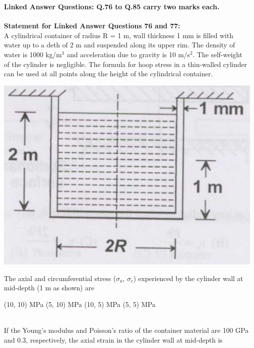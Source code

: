 \documentclass[addpoints,11pt]{exam}
\begin{document}
\begin{questions}
\large\textbf{Linked Answer Questions: Q.76 to Q.85 carry two marks each.}\\\\
\normalsize\textbf{Statement for Linked Answer Questions 76 and 77:}\\

A cylindrical container of radius R = 1 m, wall thickness 1 mm is filled with water up to a deth of 2 m and suspended along its upper rim. The density of water is 1000 kg/m$^3$ and acceleration due to gravity is 10 m/s$^2$. The self-weight of the cylinder is negligible. The formula for hoop stress in a thin-walled cylinder can be used at all points along the height of the cylindrical container.

\begin{center}
    \includegraphics[scale=0.3]{q76}
\end{center}

    \question The axial and circumferential stress ($\sigma_a$, $\sigma_c$) experienced by the cylinder wall at mid-depth (1 m as shown) are\\

    \begin{oneparchoices}
        \choice (10, 10) MPa
        \choice (5, 10) MPa
        \choice (10, 5) MPa
        \choice (5, 5) MPa
    \end{oneparchoices}\\

    \question If the Young's modulus and Poisson's ratio of the container material are 100 GPa and 0.3, respectively, the axial strain in the cylinder wall at mid-depth is\\


\end{questions}
\end{document}
